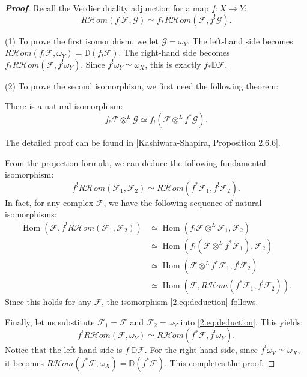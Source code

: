 \begin{proof}[\textbf{Proof}]
Recall the Verdier duality adjunction for a map $f \colon X \to Y$:
\begin{equation*}
    R\mathcal{H}om(f_! \mathcal{F}, \mathcal{G}) \simeq f_* R\mathcal{H}om(\mathcal{F}, f^! \mathcal{G}).
\end{equation*}

(1) To prove the first isomorphism, we let $\mathcal{G} = \omega_Y$. 
The left-hand side becomes $R\mathcal{H}om(f_! \mathcal{F}, \omega_Y) = \mathbb{D}(f_! \mathcal{F})$. 
The right-hand side becomes $f_* R\mathcal{H}om(\mathcal{F}, f^! \omega_Y)$. Since $f^! \omega_Y \simeq \omega_X$, this is exactly $f_* \mathbb{D}\mathcal{F}$.

(2) To prove the second isomorphism, we first need the following theorem:

\begin{theorem}
There is a natural isomorphism:
\begin{equation} 
    f_! \mathcal{F} \otimes^L \mathcal{G} \simeq f_! (\mathcal{F} \otimes^L f^* \mathcal{G}). 
\end{equation}
\end{theorem}

The detailed proof can be found in [Kashiwara-Shapira, Proposition 2.6.6].

From the projection formula, we can deduce the following fundamental isomorphism:
\begin{equation} \label{2.eq:deduction}
    f^! R\mathcal{H}om(\mathcal{F}_1, \mathcal{F}_2) \simeq R\mathcal{H}om(f^* \mathcal{F}_1, f^! \mathcal{F}_2). 
\end{equation}
In fact, for any complex $\mathcal{F}$, we have the following sequence of natural isomorphisms:
\begin{align*}
    \operatorname{Hom}(\mathcal{F}, f^! R\mathcal{H}om(\mathcal{F}_1, \mathcal{F}_2)) 
    &\simeq \operatorname{Hom}(f_! \mathcal{F} \otimes^L \mathcal{F}_1, \mathcal{F}_2) \\
    &\simeq \operatorname{Hom}(f_! (\mathcal{F} \otimes^L f^* \mathcal{F}_1), \mathcal{F}_2)\\
    &\simeq \operatorname{Hom}(\mathcal{F} \otimes^L f^* \mathcal{F}_1, f^! \mathcal{F}_2) \\
    &\simeq \operatorname{Hom}(\mathcal{F}, R\mathcal{H}om(f^* \mathcal{F}_1, f^! \mathcal{F}_2)).
\end{align*}
Since this holds for any $\mathcal{F}$, the isomorphism \eqref{2.eq:deduction} follows.

Finally, let us substitute $\mathcal{F}_1 = \mathcal{F}$ and $\mathcal{F}_2 = \omega_Y$ into \eqref{2.eq:deduction}. This yields:
\begin{equation*}
    f^! R\mathcal{H}om(\mathcal{F}, \omega_Y) \simeq R\mathcal{H}om(f^* \mathcal{F}, f^! \omega_Y).
\end{equation*}
Notice that the left-hand side is $f^! \mathbb{D}\mathcal{F}$. For the right-hand side, since $f^! \omega_Y \simeq \omega_X$, it becomes $R\mathcal{H}om(f^* \mathcal{F}, \omega_X) = \mathbb{D}(f^* \mathcal{F})$. This completes the proof.
\end{proof}

